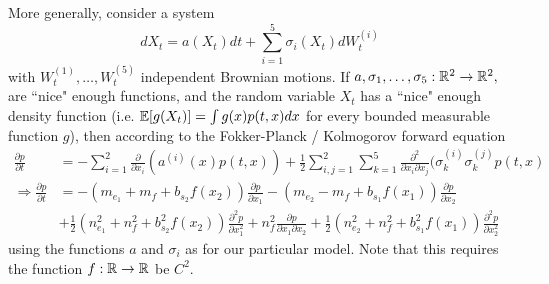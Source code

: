 \documentclass{article}
\begin{document}
More generally, consider a system
$$ dX_t=a(X_t)dt+\sum_{i=1}^5\sigma_i(X_t)dW_t^{(i)}$$
with $W_t^{(1)},\dots,W_t^{(5)}$ independent Brownian motions.
If $a,\sigma_1,\dots,\sigma_5:{\mathbb{R}}^2\to{\mathbb{R}}^2,$ are ``nice" enough functions, and the random variable $X_t$ has a ``nice" enough density function (i.e. ${\mathbb{E}}[g(X_t)]=\int g(x)p(t,x)dx$ for every bounded measurable function $g$), then according to the Fokker-Planck / Kolmogorov forward equation
\begin{align*}
\frac{\partial p}{\partial t}&=-\sum_{i=1}^2\frac{\partial}{\partial x_i}(a^{(i)}(x)p(t,x))+\frac{1}{2}\sum_{i,j=1}^2\sum_{k=1}^5\frac{\partial^2}{\partial x_i\partial x_j}(\sigma_k^{(i)}\sigma_k^{(j)}p(t,x)
\\ \Rightarrow \frac{\partial p}{\partial t}&=-(m_{e_1}+m_f+b_{s_2}f(x_2))\frac{\partial p}{\partial x_1}-(m_{e_2}-m_f+b_{s_1}f(x_1))\frac{\partial p}{\partial x_2}
\\&+\frac{1}{2}(n_{e_1}^2+n_f^2+b_{s_2}^2f(x_2))\frac{\partial^2 p}{\partial x_1^2}+n_f^2\frac{\partial p}{\partial x_1\partial x_2}+\frac{1}{2}(n_{e_2}^2+n_f^2+b_{s_1}^2f(x_1))\frac{\partial^2 p}{\partial x_2^2}
\end{align*}
using the functions $a$ and $\sigma_i$ as for our particular model.  Note that this requires the function $f:{\mathbb{R}}\to{\mathbb{R}}$ be $C^2$.
\end{document}
